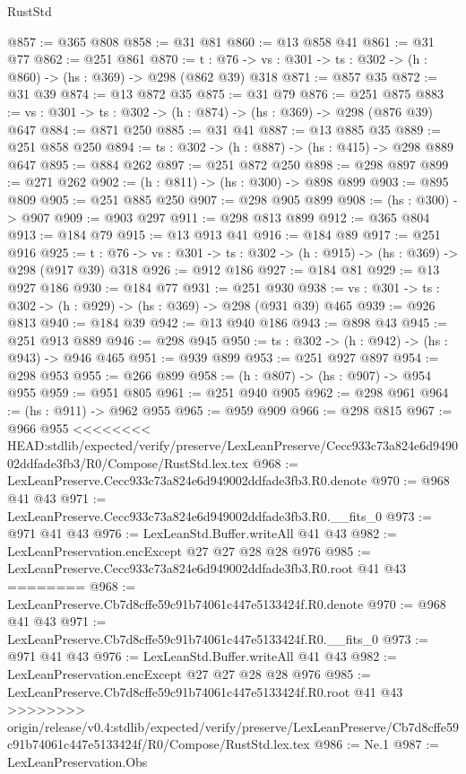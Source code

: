 \begin{lexlean}{RustStd}
\begin{coremodule}
{\begin{coremodule}
{@857 := @365 @808
@858 := @31 @81
@860 := @13 @858 @41
@861 := @31 @77
@862 := @251 @861
@870 := {t : @76} -> {vs : @301} -> {ts : @302} -> (h : @860) -> (hs : @369) -> @298 (@862 @39) @318
@871 := @857 @35
@872 := @31 @39
@874 := @13 @872 @35
@875 := @31 @79
@876 := @251 @875
@883 := {vs : @301} -> {ts : @302} -> (h : @874) -> (hs : @369) -> @298 (@876 @39) @647
@884 := @871 @250
@885 := @31 @41
@887 := @13 @885 @35
@889 := @251 @858 @250
@894 := {ts : @302} -> (h : @887) -> (hs : @415) -> @298 @889 @647
@895 := @884 @262
@897 := @251 @872 @250
@898 := @298 @897
@899 := @271 @262
@902 := (h : @811) -> (hs : @300) -> @898 @899
@903 := @895 @809
@905 := @251 @885 @250
@907 := @298 @905 @899
@908 := (hs : @300) -> @907
@909 := @903 @297
@911 := @298 @813 @899
@912 := @365 @804
@913 := @184 @79
@915 := @13 @913 @41
@916 := @184 @89
@917 := @251 @916
@925 := {t : @76} -> {vs : @301} -> {ts : @302} -> (h : @915) -> (hs : @369) -> @298 (@917 @39) @318
@926 := @912 @186
@927 := @184 @81
@929 := @13 @927 @186
@930 := @184 @77
@931 := @251 @930
@938 := {vs : @301} -> {ts : @302} -> (h : @929) -> (hs : @369) -> @298 (@931 @39) @465
@939 := @926 @813
@940 := @184 @39
@942 := @13 @940 @186
@943 := @898 @43
@945 := @251 @913 @889
@946 := @298 @945
@950 := {ts : @302} -> (h : @942) -> (hs : @943) -> @946 @465
@951 := @939 @899
@953 := @251 @927 @897
@954 := @298 @953
@955 := @266 @899
@958 := (h : @807) -> (hs : @907) -> @954 @955
@959 := @951 @805
@961 := @251 @940 @905
@962 := @298 @961
@964 := (hs : @911) -> @962 @955
@965 := @959 @909
@966 := @298 @815
@967 := @966 @955
<<<<<<<< HEAD:stdlib/expected/verify/preserve/LexLeanPreserve/Cecc933c73a824e6d949002ddfade3fb3/R0/Compose/RustStd.lex.tex
@968 := LexLeanPreserve.Cecc933c73a824e6d949002ddfade3fb3.R0.denote
@970 := @968 @41 @43
@971 := LexLeanPreserve.Cecc933c73a824e6d949002ddfade3fb3.R0.__fits_0
@973 := @971 @41 @43
@976 := LexLeanStd.Buffer.writeAll @41 @43
@982 := LexLeanPreservation.encExcept @27 @27 @28 @28 @976
@985 := LexLeanPreserve.Cecc933c73a824e6d949002ddfade3fb3.R0.root @41 @43
========
@968 := LexLeanPreserve.Cb7d8cffe59c91b74061c447e5133424f.R0.denote
@970 := @968 @41 @43
@971 := LexLeanPreserve.Cb7d8cffe59c91b74061c447e5133424f.R0.__fits_0
@973 := @971 @41 @43
@976 := LexLeanStd.Buffer.writeAll @41 @43
@982 := LexLeanPreservation.encExcept @27 @27 @28 @28 @976
@985 := LexLeanPreserve.Cb7d8cffe59c91b74061c447e5133424f.R0.root @41 @43
>>>>>>>> origin/release/v0.4:stdlib/expected/verify/preserve/LexLeanPreserve/Cb7d8cffe59c91b74061c447e5133424f/R0/Compose/RustStd.lex.tex
@986 := Ne.{1}
@987 := LexLeanPreservation.Obs
}
\end{coremodule}}
\end{coremodule}
\end{lexlean}
